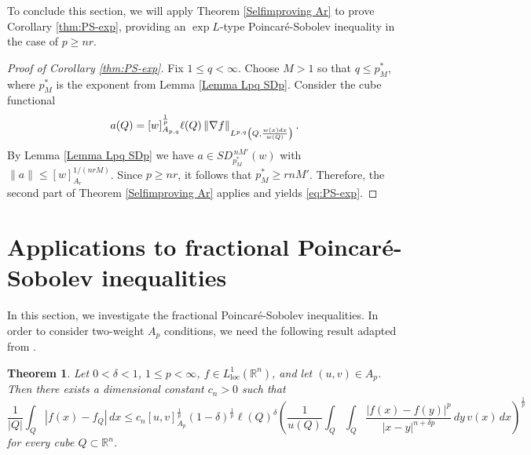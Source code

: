 \documentclass[reqno, 10pt, oneside]{amsart}
\numberwithin{equation}{section}
\newcommand{\strt}[1]{\rule{0pt}{#1}}
\newtheorem{theorem}{Theorem}
\numberwithin{theorem}{section}
\newcommand{\R}{{\mathbb R}}
\newcommand{\1}{{\rm 1\hspace*{-0.4ex}%
\rule{0.1ex}{1.52ex}\hspace*{0.2ex}}}
\begin{document}
To conclude this section, we will apply Theorem \ref{Selfimproving Ar} to prove Corollary \ref{thm:PS-exp}, providing an $\exp L$-type Poincaré-Sobolev inequality in the case of $p\ge nr$.

\begin{proof}[Proof of Corollary \ref{thm:PS-exp}]
Fix $1 \le q<\infty$. Choose $M>1$ so that $q\le p_M^{*}$, where $p_M^{*}$ is the exponent from Lemma \ref{Lemma Lpq SDp}. Consider the cube functional
	\begin{equation*}
			a(Q)= [w]_{A_{p,q}}^\frac{1}{p} \ell(Q)\left\| \nabla f \right\|_{\strt{2.3ex} L^{p,q}\left(Q, \frac{w(x)dx}{w(Q)}\right)}.
	\end{equation*}
By Lemma \ref{Lemma Lpq SDp} we have $a\in SD_{p_M^{*}}^{\,nM'}(w)$ with
$\|a\|\le [w]_{A_r}^{1/(nrM)}$. Since $p\ge nr$, it follows that $p_M^{*}\ge rnM'$. Therefore, the second part of Theorem \ref{Selfimproving Ar} applies and yields \eqref{eq:PS-exp}.
\end{proof}



\section{Applications to fractional Poincaré-Sobolev inequalities }\label{Section 6}

In this section, we investigate the fractional Poincaré-Sobolev inequalities. In order to consider two-weight $A_p$ conditions, we need the following result adapted from \cite{MPW}.


\begin{theorem}\label{thm:MPW23} 
    Let $0<\delta<1$, $1\le p<\infty$, $f\in L^1_{\operatorname{loc}}(\R^n)$, and let $(u,v)\in A_p$. Then there exists a dimensional constant $c_n>0$ such that
    \begin{equation}\label{MPW eq}
        \frac{1}{|Q|}\int_Q |f(x)-f_Q|\,dx \le c_n [u,v]_{A_p}^{\frac{1}{p}}(1-\delta)^{\frac{1}{p}}\ell(Q)^\delta \left(\frac{1}{u(Q)}\int_Q\int_Q \frac{|f(x)-f(y)|^p}{|x-y|^{n+\delta p}}\,dy\,v(x)\,dx\right)^{\frac{1}{p}}
    \end{equation}
    for every cube $Q\subset \R^n$.
\end{theorem}
\end{document}
